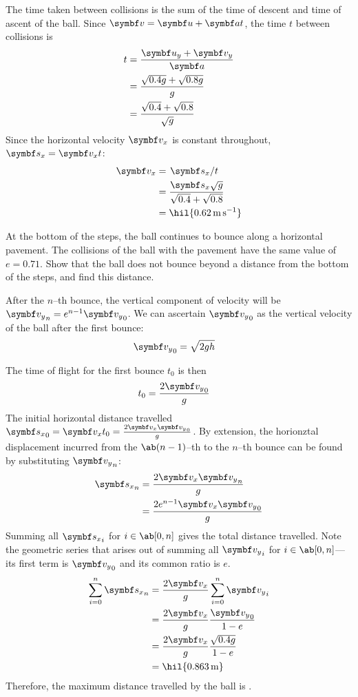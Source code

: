 The time taken between collisions is the sum of the time of descent
and time of ascent
of the ball. Since \(\mv{v} = \mv{u} + \mv{a}t\), the time \(t\)
between collisions is
\begin{align*}
  t &= \f{\mv{u}_y + \mv{v}_y}{\mv{a}} \\
  &= \f{\sqrt{0.4g} + \sqrt{0.8g}}{g} \\
  &= \f{\sqrt{0.4} + \sqrt{0.8}}{\sqrt{g}}
\end{align*}
Since the horizontal velocity \(\mv{v}_x\) is constant throughout,
\(\mv{s}_x = \mv{v}_xt\):
\begin{align*}
  \mv{v}_x &= \lf{\mv{s}_x}{t} \\
  &= \f{\mv{s}_x\sqrt{g}}{\sqrt{0.4} + \sqrt{0.8}} \\
  &= \hil{\qty{0.62}{\metre\per\second}}
\end{align*}

\begin{problem}
  At the bottom of the steps, the ball continues to bounce along a
  horizontal pavement.
  The collisions of the ball with the pavement have the same value of
  \(e = 0.71\).
  Show that the ball does not bounce beyond a distance from the
  bottom of the steps, and find this distance.
\end{problem}

After the \(n\)--th bounce, the vertical component of velocity will
be \({\mv{v}_y}_n = e^{n-1}{\mv{v}_y}_0\).
We can ascertain \({\mv{v}_y}_0\) as the vertical velocity of the ball
after the first bounce:
\begin{align*}
  {\mv{v}_y}_0 &= \sqrt{2gh}
\end{align*}

The time of flight for the first bounce \(t_0\) is then
\begin{align*}
  t_0 &= \f{2{\mv{v}_y}_0}{g}
\end{align*}
The initial horizontal distance travelled \({\mv{s}_x}_0 =
\mv{v}_xt_0 = \f{2\mv{v}_x{\mv{v}_y}_0}{g}\).
By extension, the horionztal displacement incurred from the \(\ab(n-1)\)--th
to the \(n\)--th bounce can be found by substituting \({\mv{v}_y}_n\):
\begin{align*}
  {\mv{s}_x}_n &= \f{2\mv{v}_x{\mv{v}_y}_n}{g} \\
  &= \f{2e^{n-1}\mv{v}_x{\mv{v}_y}_0}{g}
\end{align*}
Summing all \({\mv{s}_x}_i\) for \(i\in\ab[0,n]\) gives the total
distance travelled.
Note the geometric series that arises out of summing all
\({\mv{v}_y}_i\) for \(i\in\ab[0,n]\)---its
first term is \({\mv{v}_y}_0\) and its common ratio is \(e\).
\begin{align*}
  \sum_{i=0}^{n} {\mv{s}_x}_n &= \f{2\mv{v}_x}{g} \sum_{i=0}^{n} {\mv{v}_y}_i \\
  &= \f{2\mv{v}_x}{g} \f{{\mv{v}_y}_0}{1-e} \\
  &= \f{2\mv{v}_x}{g} \f{\sqrt{0.4g}}{1-e} \\
  &= \hil{\qty{0.863}{\metre}}
\end{align*}
Therefore, the maximum distance travelled by the ball is
.

